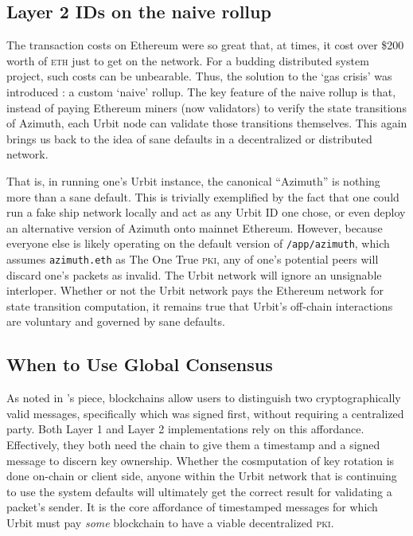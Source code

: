 \documentclass[twoside]{article}
\begin{document}
\subsection{Layer 2 IDs on the naive rollup}

The transaction costs on Ethereum were so great that, at times, it cost over \$200 worth of \textsc{eth} just to get on the network. For a budding distributed system project, such costs can be unbearable. Thus, the solution to the `gas crisis' was introduced \citep{Paprocki2021}: a custom `naive' rollup. The key feature of the naive rollup is that, instead of paying Ethereum miners (now validators) to verify the state transitions of Azimuth, each Urbit node can validate those transitions themselves. This again brings us back to the idea of sane defaults in a decentralized or distributed network.

That is, in running one's Urbit instance, the canonical ``Azimuth'' is nothing more than a sane default. This is trivially exemplified by the fact that one could run a fake ship network locally and act as any Urbit ID one chose, or even deploy an alternative version of Azimuth onto mainnet Ethereum. However, because everyone else is likely operating on the default version of \lstinline[style=inlinecode]{/app/azimuth}, which assumes \lstinline[style=inlinecode]{azimuth.eth} as The One True \textsc{pki}, any of one's potential peers will discard one's packets as invalid. The Urbit network will ignore an unsignable interloper. Whether or not the Urbit network pays the Ethereum network for state transition computation, it remains true that Urbit's off-chain interactions are voluntary and governed by sane defaults.

\subsection{When to Use Global Consensus}

As noted in 's piece, blockchains allow users to distinguish two cryptographically valid messages, specifically which was signed first, without requiring a centralized party. Both Layer 1 and Layer 2 implementations rely on this affordance. Effectively, they both need the chain to give them a timestamp and a signed message to discern key ownership. Whether the cosmputation of key rotation is done on-chain or client side, anyone within the Urbit network that is continuing to use the system defaults will ultimately get the correct result for validating a packet's sender. It is the core affordance of timestamped messages for which Urbit must pay \emph{some} blockchain to have a viable decentralized \textsc{pki}.
\end{document}
